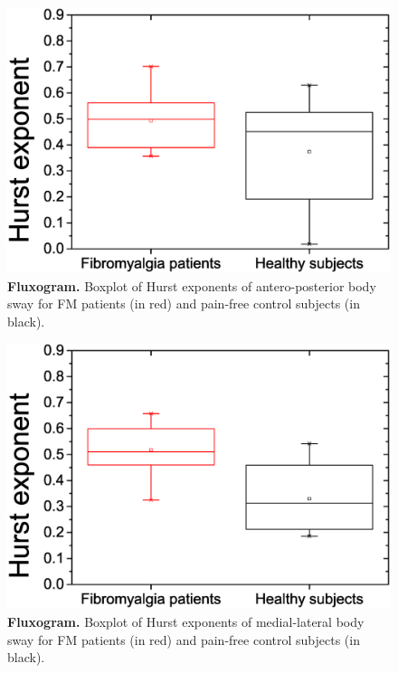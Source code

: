 \documentclass[12pt]{article}
\begin{document}
\begin{figure}[!ht]
\begin{center}
\includegraphics[width=6in]{hurst_ap}
\end{center}
\caption{
{\bf Fluxogram.} Boxplot of Hurst exponents of antero-posterior body sway for FM patients (in red) and pain-free control subjects (in black).
}
\label{fig:HurstPosteriorAnterior}
\end{figure}
\newpage

\begin{figure}[!ht]
\begin{center}
\includegraphics[width=6in]{hurst_ml}
\end{center}
\caption{
{\bf Fluxogram.} Boxplot of Hurst exponents of medial-lateral body sway for FM patients (in red) and pain-free control subjects (in black).
}
\label{fig:HurstMedialLateral}
\end{figure}
\end{document}
